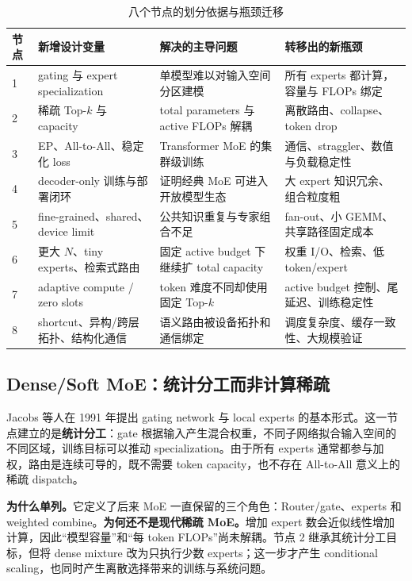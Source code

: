 \documentclass[10pt,a4paper,fontset=none]{ctexart}
\newcommand{\term}[1]{\textbf{#1}}
\begin{document}
\begin{table}[htbp]
\centering
\caption{八个节点的划分依据与瓶颈迁移}
\label{tab:evolution-nodes}
\small
\begin{tabularx}{\textwidth}{p{}p{}p{}Y}
\toprule
节点 & 新增设计变量 & 解决的主导问题 & 转移出的新瓶颈 \\
 & gating 与 expert specialization & 单模型难以对输入空间分区建模 & 所有 experts 都计算，容量与 FLOPs 绑定 \\
2 & 稀疏 Top-$k$ 与 capacity & total parameters 与 active FLOPs 解耦 & 离散路由、collapse、token drop \\
3 & EP、All-to-All、稳定化 loss & Transformer MoE 的集群级训练 & 通信、straggler、数值与负载稳定性 \\
4 & decoder-only 训练与部署闭环 & 证明经典 MoE 可进入开放模型生态 & 大 expert 知识冗余、组合粒度粗 \\
5 & fine-grained、shared、device limit & 公共知识重复与专家组合不足 & fan-out、小 GEMM、共享路径固定成本 \\
6 & 更大 $N$、tiny experts、检索式路由 & 固定 active budget 下继续扩 total capacity & 权重 I/O、检索、低 token/expert \\
7 & adaptive compute / zero slots & token 难度不同却使用固定 Top-$k$ & active budget 控制、尾延迟、训练稳定性 \\
8 & shortcut、异构/跨层拓扑、结构化通信 & 语义路由被设备拓扑和通信绑定 & 调度复杂度、缓存一致性、大规模验证 \\
\bottomrule
\end{tabularx}
\end{table}

\subsection{Dense/Soft MoE：统计分工而非计算稀疏}

Jacobs 等人在 1991 年提出 gating network 与 local experts 的基本形式\cite{jacobs1991adaptive}。这一节点建立的是\term{统计分工}：gate 根据输入产生混合权重，不同子网络拟合输入空间的不同区域，训练目标可以推动 specialization。由于所有 experts 通常都参与加权，路由是连续可导的，既不需要 token capacity，也不存在 All-to-All 意义上的稀疏 dispatch。

\textbf{为什么单列。}它定义了后来 MoE 一直保留的三个角色：Router/gate、experts 和 weighted combine。\textbf{为何还不是现代稀疏 MoE。}增加 expert 数会近似线性增加计算，因此“模型容量”和“每 token FLOPs”尚未解耦。节点 2 继承其统计分工目标，但将 dense mixture 改为只执行少数 experts；这一步才产生 conditional scaling，也同时产生离散选择带来的训练与系统问题。
\end{document}
